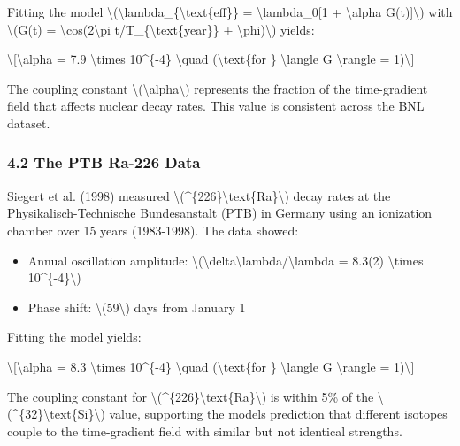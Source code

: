 \documentclass[
  10pt,
]{article}
\providecommand{\tightlist}{%
  \setlength{\itemsep}{0pt}\setlength{\parskip}{0pt}}
\begin{document}
Fitting the model
\textbackslash(\textbackslash lambda\_\{\textbackslash text\{eff\}\} =
\textbackslash lambda\_0{[}1 + \textbackslash alpha
G(t){]}\textbackslash) with \textbackslash(G(t) =
\textbackslash cos(2\textbackslash pi
t/T\_\{\textbackslash text\{year\}\} +
\textbackslash phi)\textbackslash) yields:

\textbackslash{[}\textbackslash alpha = 7.9 \textbackslash times
10\^{}\{-4\} \textbackslash quad (\textbackslash text\{for \}
\textbackslash langle G \textbackslash rangle = 1)\textbackslash{]}

The coupling constant \textbackslash(\textbackslash alpha\textbackslash)
represents the fraction of the time-gradient field that affects nuclear
decay rates. This value is consistent across the BNL dataset.

\hypertarget{the-ptb-ra-226-data}{%
\subsubsection{4.2 The PTB Ra-226 Data}\label{the-ptb-ra-226-data}}

Siegert et al. (1998) measured
\textbackslash(\^{}\{226\}\textbackslash text\{Ra\}\textbackslash) decay
rates at the Physikalisch-Technische Bundesanstalt (PTB) in Germany
using an ionization chamber over 15 years (1983-1998). The data showed:

\begin{itemize}
\tightlist
\item
  Annual oscillation amplitude:
  \textbackslash(\textbackslash delta\textbackslash lambda/\textbackslash lambda
  = 8.3(2) \textbackslash times 10\^{}\{-4\}\textbackslash)
\item
  Phase shift: \textbackslash(59\textbackslash) days from January 1
\end{itemize}

Fitting the model yields:

\textbackslash{[}\textbackslash alpha = 8.3 \textbackslash times
10\^{}\{-4\} \textbackslash quad (\textbackslash text\{for \}
\textbackslash langle G \textbackslash rangle = 1)\textbackslash{]}

The coupling constant for
\textbackslash(\^{}\{226\}\textbackslash text\{Ra\}\textbackslash) is
within 5\% of the
\textbackslash(\^{}\{32\}\textbackslash text\{Si\}\textbackslash) value,
supporting the model\textquotesingle s prediction that different
isotopes couple to the time-gradient field with similar but not
identical strengths.
\end{document}
